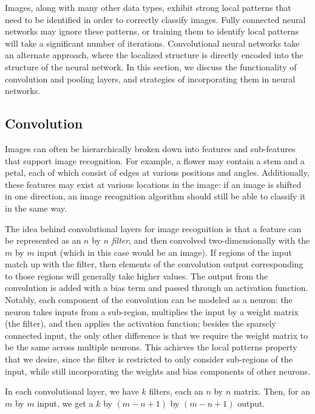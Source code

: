 \documentclass[12pt,twocolumn]{article}
\begin{document}
Images, along with many other data types, exhibit strong local patterns that need to be identified in order to correctly classify images. Fully connected neural networks may ignore these patterns, or training them to identify local patterns will take a significant number of iterations. Convolutional neural networks take an alternate approach, where the localized structure is directly encoded into the structure of the neural network. In this section, we discuss the functionality of convolution and pooling layers, and strategies of incorporating them in neural networks.

\subsection{Convolution}

Images can often be hierarchically broken down into features and sub-features that support image recognition. For example, a flower may contain a stem and a petal, each of which consist of edges at various positions and angles. Additionally, these features may exist at various locations in the image: if an image is shifted in one direction, an image recognition algorithm should still be able to classify it in the same way.

The idea behind convolutional layers for image recognition is that a feature can be represented as an $n$ by $n$ \emph{filter}, and then convolved two-dimensionally with the $m$ by $m$ input (which in this case would be an image). If regions of the input match up with the filter, then elements of the convolution output corresponding to those regions will generally take higher values. The output from the convolution is added with a bias term and passed through an activation function. Notably, each component of the convolution can be modeled as a neuron: the neuron takes inputs from a sub-region, multiplies the input by a weight matrix (the filter), and then applies the activation function; besides the sparsely connected input, the only other difference is that we require the weight matrix to be the same across multiple neurons. This achieves the local patterns property that we desire, since the filter is restricted to only consider sub-regions of the input, while still incorporating the weights and bias components of other neurons.

In each convolutional layer, we have $k$ filters, each an $n$ by $n$ matrix. Then, for an $m$ by $m$ input, we get a $k$ by $(m - n + 1)$ by $(m - n + 1)$ output.
\end{document}
